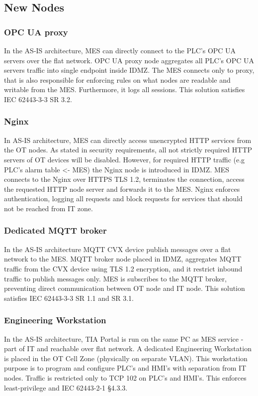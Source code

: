 \subsection{New Nodes}
\subsubsection{OPC UA proxy}
In the AS-IS architecture, MES can directly connect to the PLC's OPC UA servers over the flat network.
OPC UA proxy node aggregates all PLC's OPC UA servers traffic into single endpoint inside IDMZ.
The MES connects only to proxy, that is also responsible for enforcing rules on 
what nodes are readable and writable from the MES. Furthermore, it logs all sessions.
This solution satisfies IEC 62443-3-3 SR 3.2.
\subsubsection{Nginx}
In AS-IS architecture, MES can directly access unencrypted HTTP services from the OT nodes.
As stated in security requirements, all not strictly required HTTP servers of OT devices will be 
disabled. However, for required HTTP traffic (e.g PLC's alarm table <- MES) the Nginx node is
introduced in IDMZ. MES connects to the Nginx over HTTPS TLS 1.2, terminates the connection, access
the requested HTTP node server and forwards it to the MES. Nginx enforces authentication,
logging all requests and block requests for services that should not be reached from IT zone.
\subsubsection{Dedicated MQTT broker}
In the AS-IS architecture MQTT CVX device publish messages over a flat network to the MES.
MQTT broker node placed in IDMZ, aggregates MQTT traffic from the CVX device using TLS 1.2 encryption,
and it restrict inbound traffic to publish messages only. MES is subscribes to the
MQTT broker, preventing direct communication between OT node and IT node. This solution
satisfies IEC 62443-3-3 SR 1.1 and SR 3.1.
\subsubsection{Engineering Workstation}
In the AS-IS architecture, TIA Portal is run on the same PC as MES service - part of IT and reachable over flat network.
A dedicated Engineering Workstation is placed in the OT Cell Zone (physically on separate VLAN).
This workstation purpose is to program and configure PLC's and HMI's with separation
from IT nodes. Traffic is restricted only to TCP 102 on PLC's and HMI's. This enforces
least-privilege and IEC 62443-2-1 §4.3.3.
